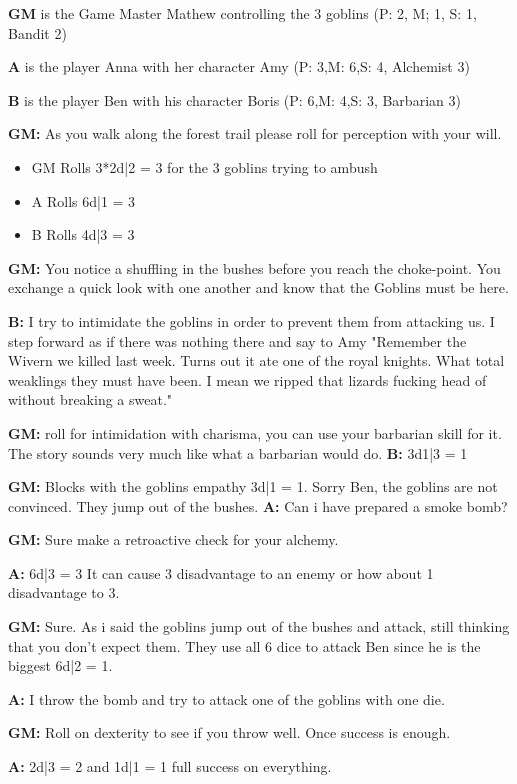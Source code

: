 \documentclass[11pt]{article}
\begin{document}
{\begin{multicols}{2}[]
\textbf{GM} is the Game Master Mathew controlling the 3 goblins (P: 2, M; 1, S: 1, Bandit 2)

\textbf{A} is the player Anna with her character Amy (P: 3,M: 6,S: 4, Alchemist 3)

\textbf{B} is the player Ben with his character Boris (P: 6,M: 4,S: 3, Barbarian 3)

\textbf{GM:} As you walk along the forest trail please roll for perception with your will.
\begin{itemize}
\item GM Rolls 3*2d|2 = 3 for the 3 goblins trying to ambush
\item A Rolls 6d|1 =  3
\item B Rolls 4d|3 =  3
\end{itemize}

\textbf{GM:} You notice a shuffling in the bushes before you reach the choke-point. You exchange a quick look with one another and know that the Goblins must be here. 

\textbf{B:} I try to intimidate the goblins in order to prevent them from attacking us. I step forward as if there was nothing there and say to Amy "Remember the Wivern we killed last week. Turns out it ate one of the royal knights. What total weaklings they must have been. I mean we ripped that lizards fucking head of without breaking a sweat."

\textbf{GM:} roll for intimidation with charisma, you can use your barbarian skill for it. The story sounds very much like what a barbarian would do.
\textbf{B:} 3d1|3 = 1

\textbf{GM:} Blocks with the goblins empathy 3d|1 = 1. Sorry Ben, the goblins are not convinced. They jump out of the bushes.
\textbf{A:} Can i have prepared a smoke bomb?

\textbf{GM:} Sure make a retroactive check for your alchemy.

\textbf{A:} 6d|3 = 3 It can cause 3 disadvantage to an enemy or how about 1 disadvantage to 3.

\textbf{GM:} Sure. As i said the goblins jump out of the bushes and attack, still thinking that you don't expect them. They use all 6 dice to attack Ben since he is the biggest 6d|2 = 1.

\textbf{A:} I throw the bomb and try to attack one of the goblins with one die.

\textbf{GM:} Roll on dexterity to see if you throw well. Once success is enough.

\textbf{A:} 2d|3 = 2 and 1d|1 = 1 full success on everything. 


\end{multicols}}
\end{document}
